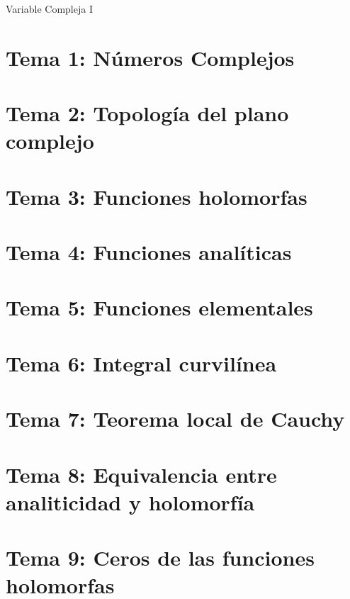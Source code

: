\documentclass[12pt]{book}
\begin{document}
    \begin{titlepage}
        \vspace*{\fill}
        \begin{center}
            {\Large Variable Compleja I}
        \end{center}
        \vspace*{\fill}
    \end{titlepage}
    \thispagestyle{empty}
    \tableofcontents
    \thispagestyle{empty}
    \thispagestyle{empty}
    \newpage
    \thispagestyle{empty}
    \newpage
    \setcounter{page}{1}
    \chapter{Tema 1: Números Complejos}
    \newpage
    \setcounter{page}{9}
    \chapter{Tema 2: Topología del plano complejo}
    \newpage
    \setcounter{page}{19}
    \chapter{Tema 3: Funciones holomorfas}
    \newpage
    \setcounter{page}{31}
    \chapter{Tema 4: Funciones analíticas}
    \newpage
    \setcounter{page}{49}
    \chapter{Tema 5: Funciones elementales}
    \newpage
    \setcounter{page}{67}
    \chapter{Tema 6: Integral curvilínea}
    \newpage
    \setcounter{page}{83}
    \chapter{Tema 7: Teorema local de Cauchy}
    \newpage
    \setcounter{page}{85}
    \chapter{Tema 8: Equivalencia entre analiticidad y holomorfía}
    \newpage
    \setcounter{page}{105}
    \chapter{Tema 9: Ceros de las funciones holomorfas}
    \newpage
    \setcounter{page}{113}
\end{document}
